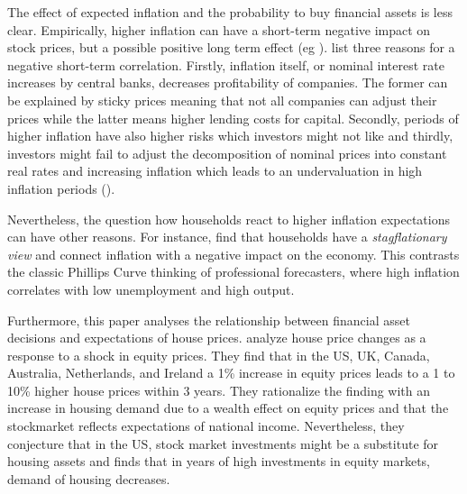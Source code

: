 \documentclass[ProjectABM]{subfiles}
\begin{document}
The effect of expected inflation and the probability to buy financial assets is less clear. Empirically, higher inflation can have a short-term negative impact on stock prices, but a possible positive long term effect (eg \cite{anari_kolari_2001inflation}). \cite{campbell_vuolteenaho_2004inflation} list three reasons for a negative short-term correlation. Firstly, inflation itself, or nominal interest rate increases by central banks, decreases profitability of companies. The former can be explained by sticky prices meaning that not all companies can adjust their prices while the latter means higher lending costs for capital. Secondly, periods of higher inflation have also higher risks which investors might not like and thirdly, investors might fail to adjust the decomposition of nominal prices into constant real rates and increasing inflation which leads to an undervaluation in high inflation periods (\cite{modigliani_cohn1979inflation}).

Nevertheless, the question how households react to higher inflation expectations can have other reasons. For instance, \cite{CCG_2020_inflation_communication} find that households have a \textit{stagflationary view} and connect inflation with a negative impact on the economy. This contrasts the classic Phillips Curve thinking of professional forecasters, where high inflation correlates with low unemployment and high output. %


Furthermore, this paper analyses the relationship between financial asset decisions and expectations of house prices. \cite{sutton2002houseprices} analyze house price changes as a response to a shock in equity prices. They find that in the US, UK, Canada, Australia, Netherlands, and Ireland a 1\% increase in equity prices leads to a 1 to 10\% higher house prices within 3 years. They rationalize the finding with an increase in housing demand due to a wealth effect on equity prices and that the stockmarket reflects expectations of national income. Nevertheless, they conjecture that in the US, stock market investments might be a substitute for housing assets and finds that in years of high investments in equity markets, demand of housing decreases. %
\end{document}
